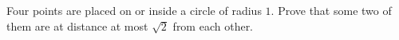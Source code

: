 Four points are placed on or inside a circle of radius $1$. Prove that some two of them are at distance at most $\sqrt2$ from each other.
